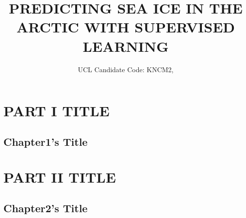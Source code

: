\documentclass[12pt]{report}
\begin{document}
\title{PREDICTING SEA ICE IN THE ARCTIC WITH SUPERVISED LEARNING}
\author{UCL Candidate Code: KNCM2, }



\beforepreface
\hypersetup{linkcolor=magenta}

\hypersetup{linkcolor=.}

\afterpreface
\hypersetup{linkcolor=magenta}



\part{PART I TITLE}                 %
\chapter{Chapter1's Title}           %
\label{Chapter}


\part{PART II TITLE}                 %
\chapter{Chapter2's Title}           %
\label{Chapter}




\end{document}
